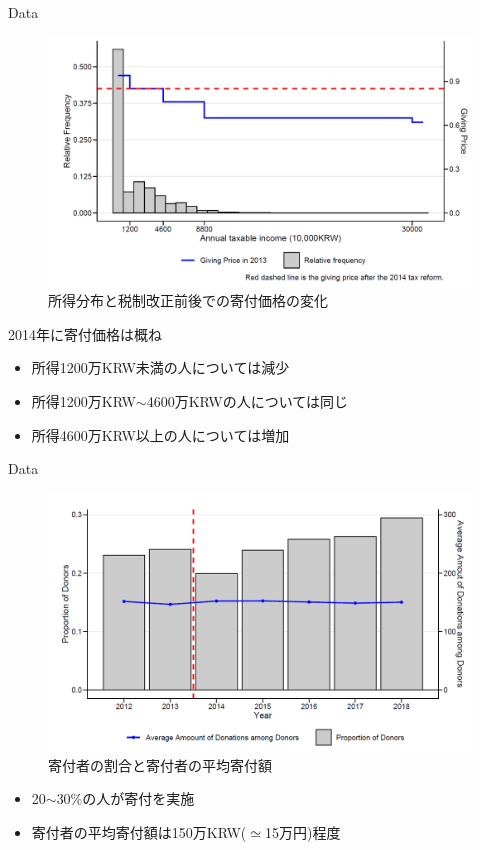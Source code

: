 \documentclass[dvipdfmx,10pt]{beamer}
\begin{document}
\begin{frame}{Data}
	\begin{figure}
		\centering
		\includegraphics[width=0.7\linewidth]{Fig_Income_distribution}
		\caption{所得分布と税制改正前後での寄付価格の変化}
		\label{fig:2}
	\end{figure}
	\small
	2014年に寄付価格は概ね
	\begin{itemize}
		\item 所得1200万KRW未満の人については減少
		\item 所得1200万KRW$\sim$4600万KRWの人については同じ
		\item 所得4600万KRW以上の人については増加
	\end{itemize}
\end{frame}
\begin{frame}{Data}
	\begin{figure}
		\centering
		\includegraphics[width=0.8\linewidth]{Fig_Average_donation}
		\caption{寄付者の割合と寄付者の平均寄付額}
		\label{fig:1}
	\end{figure}
	\small
	\begin{itemize}
		\item 20$\sim$30\%の人が寄付を実施
		\item 寄付者の平均寄付額は150万KRW($\simeq$15万円)程度
	\end{itemize}
\end{frame}
\end{document}
